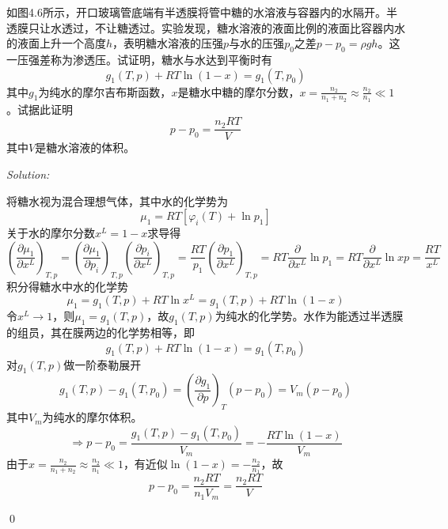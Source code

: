 \documentclass[12pt,a4paper]{article}
\newenvironment{problem}[2][Problem]{\begin{trivlist}
\item[\hskip \labelsep {\bfseries #1}\hskip \labelsep {\bfseries #2.}]}{\end{trivlist}}
\newenvironment{sol}
    {\emph{Solution:}
    }
    {
    \qed
    }
\begin{document}
\begin{problem}{4.6}
如图4.6所示，开口玻璃管底端有半透膜将管中糖的水溶液与容器内的水隔开。半透膜只让水透过，不让糖透过。实验发现，糖水溶液的液面比例的液面比容器内水的液面上升一个高度$h$，表明糖水溶液的压强$p$与水的压强$p_0$之差$p-p_0=\rho gh$。这一压强差称为渗透压。试证明，糖水与水达到平衡时有
\[
g_1(T,p)+RT\ln(1-x)=g_1(T,p_0)
\]
其中$g_1$为纯水的摩尔吉布斯函数，$x$是糖水中糖的摩尔分数，$x=\frac{n_2}{n_1+n_2}\approx\frac{n_2}{n_1}\ll1$。试据此证明
\[
p-p_0=\frac{n_2RT}{V}
\]
其中$V$是糖水溶液的体积。
\end{problem}
\begin{sol}
将糖水视为混合理想气体，其中水的化学势为
\begin{equation}
\mu_1=RT[\varphi_i(T)+\ln p_1]
\end{equation}
关于水的摩尔分数$x^L=1-x$求导得
\begin{equation}
\left(\frac{\partial\mu_1}{\partial x^L}\right)_{T,p}=\left(\frac{\partial\mu_1}{\partial p_i}\right)_{T,p}\left(\frac{\partial p_i}{\partial x^L}\right)_{T,p}=\frac{RT}{p_1}\left(\frac{\partial p_1}{\partial x^L}\right)_{T,p}=RT\frac{\partial}{\partial x^L}\ln p_1=RT\frac{\partial}{\partial x^L}\ln xp=\frac{RT}{x^L}
\end{equation}
积分得糖水中水的化学势
\begin{equation}
\mu_1=g_1(T,p)+RT\ln x^L=g_1(T,p)+RT\ln(1-x)
\end{equation}
令$x^L\rightarrow1$，则$\mu_1=g_1(T,p)$，故$g_1(T,p)$为纯水的化学势。水作为能透过半透膜的组员，其在膜两边的化学势相等，即
\begin{equation}
g_1(T,p)+RT\ln(1-x)=g_1(T,p_0)
\end{equation}
对$g_1(T,p)$做一阶泰勒展开
\begin{equation}
g_1(T,p)-g_1(T,p_0)=\left(\frac{\partial g_1}{\partial p}\right)_T(p-p_0)=V_m(p-p_0)
\end{equation}
其中$V_m$为纯水的摩尔体积。
\begin{equation}
\Longrightarrow p-p_0=\frac{g_1(T,p)-g_1(T,p_0)}{V_m}=-\frac{RT\ln(1-x)}{V_m}
\end{equation}
由于$x=\frac{n_2}{n_1+n_2}\approx\frac{n_2}{n_1}\ll1$，有近似$\ln(1-x)=-\frac{n_2}{n_1}$，故
\begin{equation}
p-p_0=\frac{n_2RT}{n_1V_m}=\frac{n_2RT}{V}
\end{equation}
\end{sol}
\end{document}

